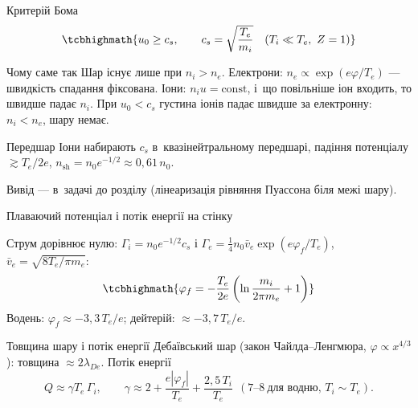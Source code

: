 \documentclass[]{beamer}
\begin{document}
\begin{frame}{Критерій Бома}
	\begin{equation*}
		\tcbhighmath{u_0\ge c_s,\qquad c_s=\sqrt{\frac{T_e}{m_i}}\quad(T_i\ll T_e,\ Z=1)}
	\end{equation*}
	\begin{block}{Чому саме так}\justifying\small
		Шар існує лише при $n_i>n_e$. Електрони: $n_e\propto\exp(e\varphi/T_e)$ --- швидкість спадання фіксована. Іони: $n_iu=\text{const}$, і~що
		повільніше іон входить, то швидше падає $n_i$. При $u_0<c_s$ густина іонів падає швидше за електронну: $n_i<n_e$, шару немає.
	\end{block}
	\begin{block}{Передшар}\justifying\small
		Іони набирають $c_s$ в~квазінейтральному передшарі, падіння потенціалу $\gtrsim T_e/2e$, $n_{\mathrm{sh}}=n_0e^{-1/2}\approx0{,}61\,n_0$.
	\end{block}
	\begin{block}{}\small
		Вивід --- в~задачі до розділу (лінеаризація рівняння Пуассона біля межі шару).
	\end{block}
\end{frame}

\begin{frame}{Плаваючий потенціал і потік енергії на стінку}
	\begin{block}{}\justifying\small
		Струм дорівнює нулю: $\Gamma_i=n_0e^{-1/2}c_s$ і $\Gamma_e=\tfrac14n_0\bar v_e\exp(e\varphi_f/T_e)$, $\bar v_e=\sqrt{8T_e/\pi m_e}$:
		\begin{equation*}
			\tcbhighmath{\varphi_f=-\frac{T_e}{2e}\left(\ln\frac{m_i}{2\pi m_e}+1\right)}
		\end{equation*}
		Водень: $\varphi_f\approx-3{,}3\,T_e/e$; дейтерій: $\approx-3{,}7\,T_e/e$.
	\end{block}
	\begin{block}{Товщина шару і потік енергії}\justifying\small
		Дебаївський шар (закон Чайлда--Ленгмюра, $\varphi\propto x^{4/3}$): товщина $\approx2\lambda_{De}$. Потік енергії
		\begin{equation*}
			Q\approx\gamma T_e\,\Gamma_i,\qquad\gamma\approx2+\frac{e|\varphi_f|}{T_e}+\frac{2{,}5\,T_i}{T_e}\ \ (7\text{--}8\ \text{для водню, }T_i\sim T_e).
		\end{equation*}
	\end{block}
\end{frame}
\end{document}
